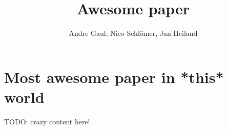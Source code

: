\documentclass[a4paper,10pt]{article}
\title{Awesome paper}
\author{Andre Gaul, Nico Schlömer, Jan Heiland}
\begin{document}
\maketitle
\tableofcontents

\section{Most awesome paper in *this* world}
TODO: crazy content here!



\end{document}
